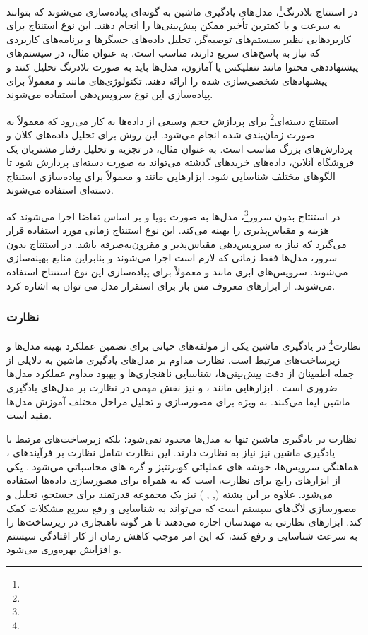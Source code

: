 در استنتاج بلادرنگ\footnote{}، مدل‌های یادگیری ماشین به گونه‌ای پیاده‌سازی می‌شوند که بتوانند به سرعت و با کمترین تأخیر ممکن پیش‌بینی‌ها را انجام دهند. این نوع استنتاج برای کاربردهایی نظیر سیستم‌های توصیه‌گر، تحلیل داده‌های حسگرها و برنامه‌های کاربردی که نیاز به پاسخ‌های سریع دارند، مناسب است. به عنوان مثال، در سیستم‌های پیشنهاددهی محتوا مانند نتفلیکس یا آمازون، مدل‌ها باید به صورت بلادرنگ تحلیل کنند و پیشنهادهای شخصی‌سازی شده را ارائه دهند. تکنولوژی‌های مانند  و  معمولاً برای پیاده‌سازی این نوع سرویس‌دهی استفاده می‌شوند.

استنتاج دسته‌ای\footnote{} برای پردازش حجم وسیعی از داده‌ها به کار می‌رود که معمولاً به صورت زمان‌بندی شده انجام می‌شود. این روش برای تحلیل داده‌های کلان و پردازش‌های بزرگ مناسب است. به عنوان مثال، در تجزیه و تحلیل رفتار مشتریان یک فروشگاه آنلاین، داده‌های خریدهای گذشته می‌تواند به صورت دسته‌ای پردازش شود تا الگوهای مختلف شناسایی شود. ابزارهایی مانند \cite{Spark} و  معمولاً برای پیاده‌سازی استنتاج دسته‌ای استفاده می‌شوند.

در استنتاج بدون سرور\footnote{}، مدل‌ها به صورت پویا و بر اساس تقاضا اجرا می‌شوند که هزینه و مقیاس‌پذیری را بهینه می‌کند. این نوع استنتاج زمانی مورد استفاده قرار می‌گیرد که نیاز به سرویس‌دهی مقیاس‌پذیر و مقرون‌به‌صرفه باشد. در استنتاج بدون سرور، مدل‌ها فقط زمانی که لازم است اجرا می‌شوند و بنابراین منابع بهینه‌سازی می‌شوند. سرویس‌های ابری مانند  و  معمولاً برای پیاده‌سازی این نوع استنتاج استفاده می‌شوند. از ابزارهای معروف متن باز برای استقرار مدل می توان به \cite{Knative} اشاره کرد. 

\subsubsection{نظارت}
نظارت\footnote{} در یادگیری ماشین یکی از مولفه‌های حیاتی برای تضمین عملکرد بهینه مدل‌ها و زیرساخت‌های مرتبط است. نظارت مداوم بر مدل‌های یادگیری ماشین به دلایلی از  جمله اطمینان از دقت پیش‌بینی‌ها، شناسایی ناهنجاری‌ها و بهبود مداوم عملکرد مدل‌ها ضروری است \cite{MLOpsData}. ابزارهایی مانند ، و  نیز نقش مهمی در نظارت بر مدل‌های یادگیری ماشین ایفا می‌کنند.  به ویژه برای مصورسازی و تحلیل مراحل مختلف آموزش مدل‌ها مفید است. 

نظارت در یادگیری ماشین تنها به مدل‌ها محدود نمی‌شود؛ بلکه زیرساخت‌های مرتبط با یادگیری ماشین نیز نیاز به نظارت دارند. این نظارت شامل نظارت بر فرآیندهای ، هماهنگی سرویس‌ها، خوشه های عملیاتی کوبرنتیز و گره های محاسباتی می‌شود \cite{MLOpsProd2}. یکی از ابزارهای رایج برای نظارت،  است که به همراه  برای مصورسازی داده‌ها استفاده می‌شود. علاوه بر این پشته  (, , ) نیز یک مجموعه قدرتمند برای جستجو، تحلیل و مصورسازی لاگ‌های سیستم است که می‌تواند به شناسایی و رفع سریع مشکلات کمک کند. ابزارهای نظارتی به مهندسان اجازه می‌دهند تا هر گونه ناهنجاری در زیرساخت‌ها را به سرعت شناسایی و رفع کنند، که این امر موجب کاهش زمان از کار افتادگی سیستم و افزایش بهره‌وری می‌شود.
 
